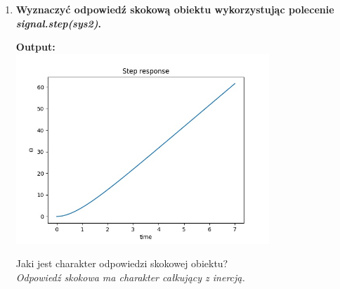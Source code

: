 \documentclass[12pt]{article}
\begin{document}
\begin{enumerate}
        \item\textbf{Wyznaczyć odpowiedź skokową obiektu wykorzystując polecenie \emph{signal.step(sys2)}.}
            \begin{shbox}
                \centering
                \textbf{Output:} \\
                \includegraphics[width=0.75\textwidth]{lab2/zad4_2.jpg}
            \end{shbox}
            Jaki jest charakter odpowiedzi skokowej obiektu?\\
            \emph{Odpowiedź skokowa ma charakter całkujący z inercją.}


\end{enumerate}
\end{document}
